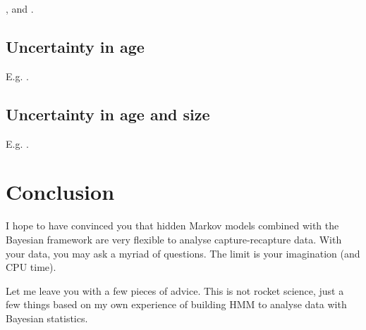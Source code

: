 \documentclass[
  12pt,
]{krantz}
\begin{document}
\citet{choquet_semi-markov_2011}, \citet{peron_evidence_2016} and \citet{marzo2011}.

\section{Uncertainty in age}\label{uncertainty-in-age}

E.g. \citet{Gervasi2017}.

\section{Uncertainty in age and size}\label{uncertainty-in-age-and-size}

E.g. \citet{gowan2021uncertainty}.

\chapter*{Conclusion}\label{conclusion}


I hope to have convinced you that hidden Markov models combined with the Bayesian framework are very flexible to analyse capture-recapture data. With your data, you may ask a myriad of questions. The limit is your imagination (and CPU time).

Let me leave you with a few pieces of advice. This is not rocket science, just a few things based on my own experience of building HMM to analyse data with Bayesian statistics.
\end{document}
